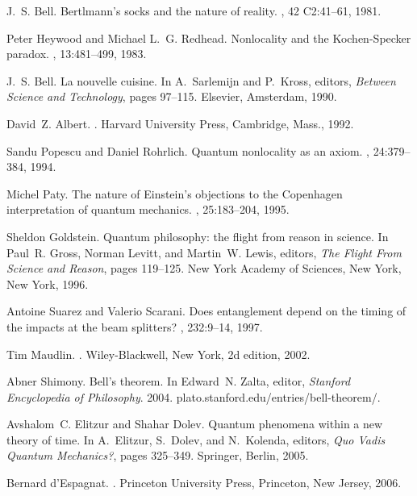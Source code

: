 \documentclass[10pt]{article} %
\begin{document}
\begin{thebibliography}{10}

J.~S. Bell.
\newblock Bertlmann's socks and the nature of reality.
, 42 C2:41--61, 1981.

Peter Heywood and Michael L.~G. Redhead.
\newblock Nonlocality and the {K}ochen-{S}pecker paradox.
, 13:481--499, 1983.

J.~S. Bell.
\newblock La nouvelle cuisine.
\newblock In A.~Sarlemijn and P.~Kross, editors, {\em Between Science and
  Technology}, pages 97--115. Elsevier, Amsterdam, 1990.

David~Z. Albert.
.
\newblock Harvard University Press, Cambridge, Mass., 1992.

Sandu Popescu and Daniel Rohrlich.
\newblock Quantum nonlocality as an axiom.
, 24:379--384, 1994.

Michel Paty.
\newblock The nature of {E}instein's objections to the {C}openhagen
  interpretation of quantum mechanics.
, 25:183--204, 1995.

Sheldon Goldstein.
\newblock Quantum philosophy: the flight from reason in science.
\newblock In Paul~R. Gross, Norman Levitt, and Martin~W. Lewis, editors, {\em
  The Flight From Science and Reason}, pages 119--125. New York Academy of
  Sciences, New York, New York, 1996.

Antoine Suarez and Valerio Scarani.
\newblock Does entanglement depend on the timing of the impacts at the beam
  splitters?
, 232:9--14, 1997.

Tim Maudlin.
.
\newblock Wiley-Blackwell, New York, 2d edition, 2002.

Abner Shimony.
\newblock Bell's theorem.
\newblock In Edward~N. Zalta, editor, {\em Stanford Encyclopedia of
  Philosophy}. 2004.
\newblock plato.stanford.edu/entries/bell-theorem/.

Avshalom~C. Elitzur and Shahar Dolev.
\newblock Quantum phenomena within a new theory of time.
\newblock In A.~Elitzur, S.~Dolev, and N.~Kolenda, editors, {\em Quo Vadis
  Quantum Mechanics?}, pages 325--349. Springer, Berlin, 2005.

Bernard d'Espagnat.
.
\newblock Princeton University Press, Princeton, New Jersey, 2006.


\end{thebibliography}
\end{document}
